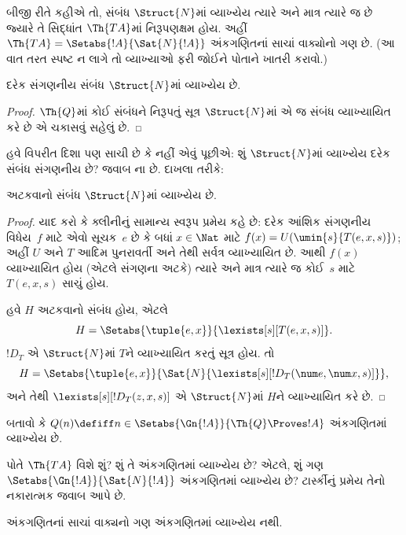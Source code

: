 બીજી રીતે કહીએ તો, સંબંધ $\Struct{N}$માં વ્યાખ્યેય ત્યારે અને માત્ર ત્યારે જ છે જ્યારે તે સિદ્ધાંત $\Th{TA}$માં નિરૂપણક્ષમ હોય. અહીં $\Th{TA} = \Setabs{!A}{\Sat{N}{!A}}$ અંકગણિતનાં સાચાં વાક્યોનો ગણ છે. (આ વાત તરત સ્પષ્ટ ન લાગે તો વ્યાખ્યાઓ ફરી જોઈને પોતાને ખાતરી કરાવો.)

\begin{lem}
દરેક સંગણનીય સંબંધ $\Struct{N}$માં વ્યાખ્યેય છે.
\end{lem}

\begin{proof}
$\Th{Q}$માં કોઈ સંબંધને નિરૂપતું સૂત્ર $\Struct{N}$માં એ જ સંબંધ વ્યાખ્યાયિત કરે છે એ ચકાસવું સહેલું છે.
\end{proof}

હવે વિપરીત દિશા પણ સાચી છે કે નહીં એવું પૂછીએ: શું $\Struct{N}$માં વ્યાખ્યેય દરેક સંબંધ સંગણનીય છે? જવાબ ના છે. દાખલા તરીકે:

\begin{lem}
અટકવાનો સંબંધ $\Struct{N}$માં વ્યાખ્યેય છે.
\end{lem}

\begin{proof}
યાદ કરો કે ક્લીનીનું સામાન્ય સ્વરૂપ પ્રમેય કહે છે: દરેક આંશિક સંગણનીય વિધેય~$f$ માટે એવો સૂચક~$e$ છે કે બધાં $x \in \Nat$ માટે $f(x) = U(\umin{s}{T(e,x,s)})$; અહીં $U$ અને $T$ આદિમ પુનરાવર્તી અને તેથી સર્વત્ર વ્યાખ્યાયિત છે. આથી $f(x)$ વ્યાખ્યાયિત હોય (એટલે સંગણના અટકે) ત્યારે અને માત્ર ત્યારે જ કોઈ~$s$ માટે $T(e,x,s)$ સાચું હોય.

હવે $H$ અટકવાનો સંબંધ હોય, એટલે
\[
H = \Setabs{\tuple{e,x}}{\lexists[s][T(e, x, s)]}.
\]
$!D_T$ એ $\Struct{N}$માં $T$ને વ્યાખ્યાયિત કરતું સૂત્ર હોય. તો
\[
H = \Setabs{\tuple{e,x}}{\Sat{N}{\lexists[s][!D_T(\num e, \num x, s)]}},
\]
અને તેથી $\lexists[s][!D_T(z, x, s)]$ એ $\Struct{N}$માં $H$ને વ્યાખ્યાયિત કરે છે.
\end{proof}

\begin{prob}
બતાવો કે $Q(n) \defiff n \in \Setabs{\Gn{!A}}{\Th{Q} \Proves !A}$ અંકગણિતમાં વ્યાખ્યેય છે.
\end{prob}

પોતે $\Th{TA}$ વિશે શું? શું તે અંકગણિતમાં વ્યાખ્યેય છે? એટલે, શું ગણ $\Setabs{\Gn{!A}}{\Sat{N}{!A}}$ અંકગણિતમાં વ્યાખ્યેય છે? ટાર્સ્કીનું પ્રમેય તેનો નકારાત્મક જવાબ આપે છે.

\begin{thm}
અંકગણિતનાં સાચાં વાક્યનો ગણ અંકગણિતમાં વ્યાખ્યેય નથી.
\end{thm}

